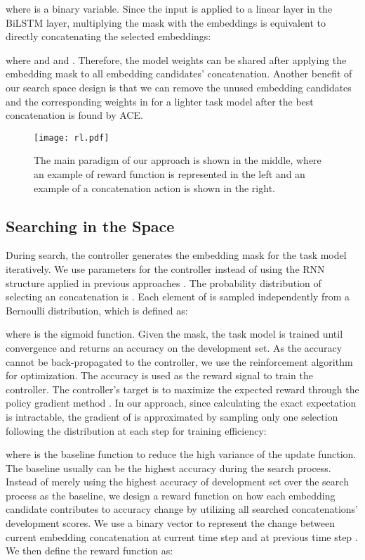 \documentclass[11pt,a4paper]{article}
\begin{document}
where  is a binary variable. Since the input  is applied to a linear layer in the BiLSTM layer, multiplying the mask with the embeddings is equivalent to directly concatenating the selected embeddings:

where  and  and . Therefore, the model weights can be shared after applying the embedding mask to all embedding candidates' concatenation. Another benefit of our search space design is that we can remove the unused embedding candidates and the corresponding weights in  for a lighter task model after the best concatenation is found by ACE.

\begin{figure*}
	\centering
	\texttt{[image: rl.pdf]}
	\caption{The main paradigm of our approach is shown in the middle, where an example of reward function is represented in the left and an example of a concatenation action is shown in the right.}
	\label{fig:architecture}
\end{figure*}


\subsection{Searching in the Space}
During search, the controller generates the embedding mask for the task model iteratively. We use parameters  for the controller instead of using the RNN structure applied in previous approaches \citep{zoph2016neural,zoph2018learning}. The probability distribution of selecting an concatenation  is . Each element  of  is
sampled independently from a Bernoulli distribution,
which is defined as:

where  is the sigmoid function.
Given the mask, the task model is trained until convergence and returns an accuracy  on the development set. 
As the accuracy cannot be back-propagated to the controller, we use the reinforcement algorithm for optimization. 
The accuracy  is used as the reward signal to train the controller. 
The controller's target is to maximize the expected reward  through the policy gradient method \citep{williams1992simple}.
In our approach, since calculating the exact expectation is intractable, the gradient of  is approximated by sampling only one selection following the distribution  at each step for training efficiency:
 
where  is the baseline function to reduce the high variance of the update function. The baseline usually can be the highest accuracy during the search process. 
Instead of merely using the highest accuracy of development set over the search process as the baseline, we design a reward function on how each embedding candidate contributes to accuracy change by utilizing all searched concatenations' development scores.
We use a binary vector  to represent the change between current embedding concatenation  at current time step  and  at previous time step .
We then define the reward function as:
\end{document}
